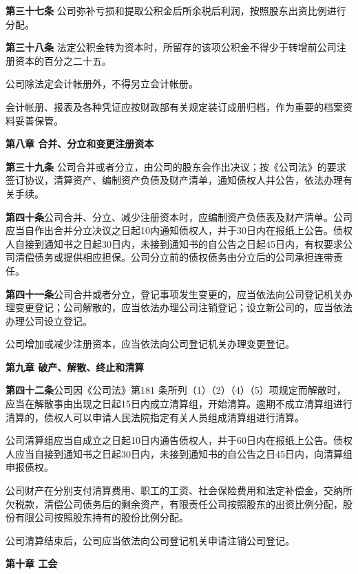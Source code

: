 \textbf{第三十七条} \quad  公司弥补亏损和提取公积金后所余税后利润，按照股东出资比例进行分配。

\textbf{第三十八条} \quad 法定公积金转为资本时，所留存的该项公积金不得少于转增前公司注册资本的百分之二十五。

公司除法定会计帐册外，不得另立会计帐册。

会计帐册、报表及各种凭证应按财政部有关规定装订成册归档，作为重要的档案资料妥善保管。


\begin{center}
\textbf{第八章 \quad   合并、分立和变更注册资本}
\end{center}

\textbf{第三十九条} \quad  公司合并或者分立，由公司的股东会作出决议；按《公司法》的要求签订协议，清算资产、编制资产负债及财产清单，通知债权人并公告，依法办理有关手续。

\textbf{第四十条}\quad  公司合并、分立、减少注册资本时，应编制资产负债表及财产清单。公司应当自作出合并分立决议之日起10内通知债权人，并于30日内在报纸上公告。债权人自接到通知书之日起30日内，未接到通知书的自公告之日起45日内，有权要求公司清偿债务或提供相应担保。公司分立前的债权债务由分立后的公司承担连带责任。

\textbf{第四十一条}\quad  公司合并或者分立，登记事项发生变更的，应当依法向公司登记机关办理变更登记；公司解散的，应当依法办理公司注销登记；设立新公司的，应当依法办理公司设立登记。

公司增加或减少注册资本，应当依法向公司登记机关办理变更登记。


\begin{center}
\textbf{第九章 \quad  破产、解散、终止和清算}
\end{center}

\textbf{第四十二条}\quad   公司因《公司法》第181 条所列（1）（2）（4）（5）项规定而解散时，应当在解散事由出现之日起15日内成立清算组，开始清算。逾期不成立清算组进行清算的，债权人可以申请人民法院指定有关人员组成清算组进行清算。

公司清算组应当自成立之日起10日内通告债权人，并于60日内在报纸上公告。债权人应当自接到通知书之日起30日内，未接到通知书的自公告之日45日内，向清算组申报债权。

公司财产在分别支付清算费用、职工的工资、社会保险费用和法定补偿金，交纳所欠税款，清偿公司债务后的剩余资产，有限责任公司按照股东的出资比例分配，股份有限公司按照股东持有的股份比例分配。

公司清算结束后，公司应当依法向公司登记机关申请注销公司登记。

\begin{center}
\textbf{第十章 \quad 工会}
\end{center}

